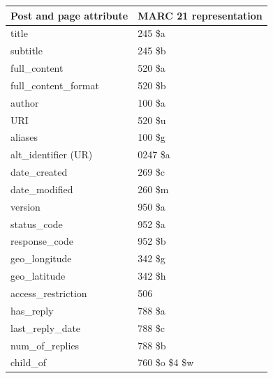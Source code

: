 \begin{table}
{\begin{tabular}{@{}ll@{}} \toprule
\textbf{Post and page attribute} & \textbf{MARC 21 representation} \\ \hline
title & 245 \$a \\
subtitle & 245 \$b \\
full\_content & 520 \$a \\
full\_content\_format & 520 \$b \\
author & 100 \$a \\
URI & 520 \$u \\
aliases & 100 \$g \\
alt\_identifier (UR) & 0247 \$a \\
date\_created & 269 \$c\\
date\_modified & 260 \$m \\
version & 950 \$a \\
status\_code & 952 \$a \\
response\_code & 952 \$b \\
geo\_longitude & 342 \$g \\
geo\_latitude & 342 \$h \\
access\_restriction & 506 \\
has\_reply & 788 \$a \\
last\_reply\_date & 788 \$c \\
num\_of\_replies & 788 \$b \\
child\_of & 760 \$o \$4 \$w\\
\hline
\end{tabular}}
\label{table:post-page-shared-attributes}
\end{table}

